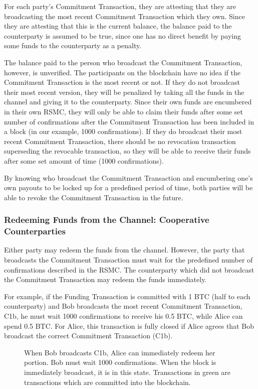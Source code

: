 \documentclass[letterpaper,11pt]{article}
\begin{document}
For each party's Commitment Transaction, they are attesting that they are
broadcasting the most recent Commitment Transaction which they own. Since they
are attesting that this is the current balance, the balance paid to the
counterparty is assumed to be true, since one has no direct benefit by paying
some funds to the counterparty as a penalty.

The balance paid to the person who broadcast the Commitment Transaction,
however, is unverified. The participants on the blockchain have no idea if the
Commitment Transaction is the most recent or not. If they do not broadcast their
most recent version, they will be penalized by taking all the funds in the
channel and giving it to the counterparty. Since their own funds are encumbered
in their own RSMC, they will only be able to claim their funds after some set
number of confirmations after the Commitment Transaction has been included in a
block (in our example, 1000 confirmations). If they do broadcast their most
recent Commitment Transaction, there should be no revocation transaction
superseding the revocable transaction, so they will be able to receive their
funds after some set amount of time (1000 confirmations).

By knowing who broadcast the Commitment Transaction and encumbering one's own
payouts to be locked up for a predefined period of time, both parties will be
able to revoke the Commitment Transaction in the future.

\subsubsection{Redeeming Funds from the Channel: Cooperative Counterparties}

Either party may redeem the funds from the channel. However, the party that
broadcasts the Commitment Transaction must wait for the predefined number of
confirmations described in the RSMC. The counterparty which did not broadcast
the Commitment Transaction may redeem the funds immediately.

For example, if the Funding Transaction is committed with 1 BTC (half to each
counterparty) and Bob broadcasts the most recent Commitment Transaction, C1b, he
must wait 1000 confirmations to receive his 0.5 BTC, while Alice can spend 0.5
BTC. For Alice, this transaction is fully closed if Alice agrees that Bob
broadcast the correct Commitment Transaction (C1b).

\begin{figure}[H]
	\caption{When Bob broadcasts C1b, Alice can immediately redeem her
		portion. Bob must wait 1000 confirmations. When the block is
		immediately broadcast, it is in this state. Transactions in
		green are transactions which are committed into the blockchain.
	}
\end{figure}
\end{document}
